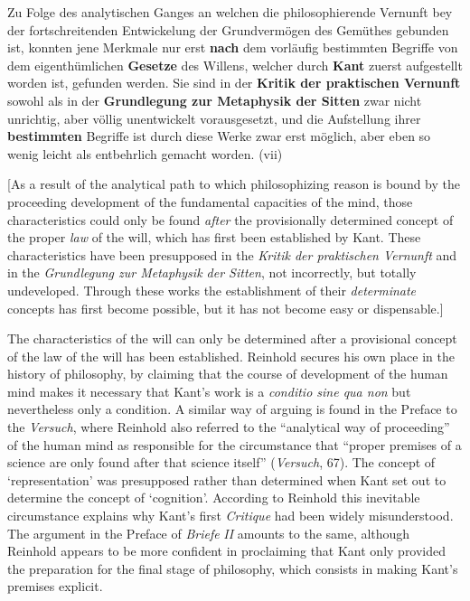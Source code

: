 Zu Folge des analytischen Ganges an welchen die philosophierende Vernunft bey der fortschreitenden Entwickelung der Grundverm\"{o}gen des Gem\"{u}thes gebunden ist, konnten jene Merkmale nur erst \textbf{nach} dem vorl\"{a}ufig bestimmten Begriffe von dem eigenth\"{u}mlichen \textbf{Gesetze} des Willens, welcher durch \textbf{Kant} zuerst aufgestellt worden ist, gefunden werden. Sie sind in der \textbf{Kritik der praktischen Vernunft} sowohl als in der \textbf{Grundlegung zur Metaphysik der Sitten} zwar nicht unrichtig, aber v\"{o}llig unentwickelt vorausgesetzt, und die Aufstellung ihrer \textbf{bestimmten} Begriffe ist durch diese Werke zwar erst m\"{o}glich, aber eben so wenig leicht als entbehrlich gemacht worden. (vii)

[As a result of the analytical path to which philosophizing reason is bound by the proceeding development of the fundamental capacities of the mind, those characteristics could only be found \textit{after} the provisionally determined concept of the proper \textit{law} of the will, which has first been established by Kant. These characteristics have been presupposed in the \textit{Kritik der praktischen Vernunft} and in the \textit{Grundlegung zur Metaphysik der Sitten}, not incorrectly, but totally undeveloped. Through these works the establishment of their \textit{determinate} concepts has first become possible, but it has not become easy or dispensable.]

The characteristics of the will can only be determined after a provisional concept of the law of the will has been established. Reinhold secures his own place in the history of philosophy, by claiming that the course of development of the human mind makes it necessary that Kant's work is a \textit{conditio sine qua non} but nevertheless only a condition. A similar way of arguing is found in the Preface to the \textit{Versuch}, where Reinhold also referred to the ``analytical way of proceeding'' of the human mind as responsible for the circumstance that ``proper premises of a science are only found after that science itself'' (\textit{Versuch}, 67). The concept of `representation' was presupposed rather than determined when Kant set out to determine the concept of `cognition'. According to Reinhold this inevitable circumstance explains why Kant's first \textit{Critique }had been widely misunderstood. The argument in the Preface of \textit{Briefe} \textit{II} amounts to the same, although Reinhold appears to be more confident in proclaiming that Kant only provided the preparation for the final stage of philosophy, which consists in making Kant's premises explicit. 

